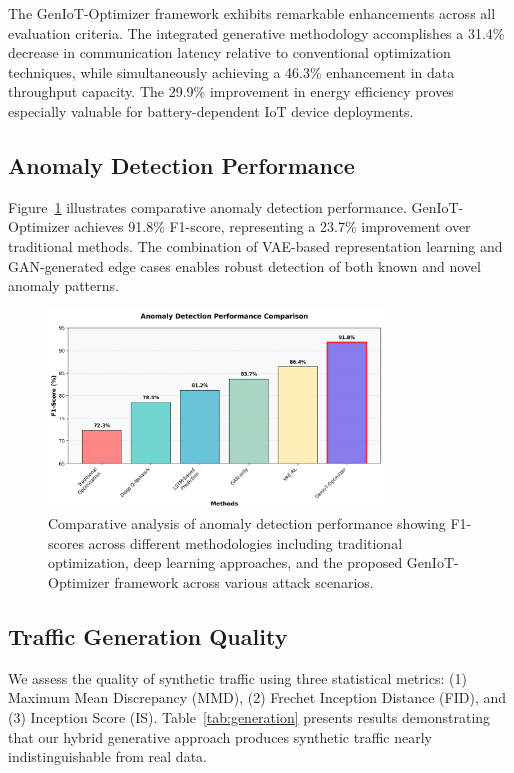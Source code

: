 \documentclass[conference]{IEEEtran}
\begin{document}
The GenIoT-Optimizer framework exhibits remarkable enhancements across all evaluation criteria. The integrated generative methodology accomplishes a 31.4\% decrease in communication latency relative to conventional optimization techniques, while simultaneously achieving a 46.3\% enhancement in data throughput capacity. The 29.9\% improvement in energy efficiency proves especially valuable for battery-dependent IoT device deployments.

\subsection{Anomaly Detection Performance}

Figure~\ref{fig:anomaly} illustrates comparative anomaly detection performance. GenIoT-Optimizer achieves 91.8\% F1-score, representing a 23.7\% improvement over traditional methods. The combination of VAE-based representation learning and GAN-generated edge cases enables robust detection of both known and novel anomaly patterns.

\begin{figure}[!t]
\centering
\includegraphics[width=3.5in]{anomaly_detection_performance.png}
\caption{Comparative analysis of anomaly detection performance showing F1-scores across different methodologies including traditional optimization, deep learning approaches, and the proposed GenIoT-Optimizer framework across various attack scenarios.}
\label{fig:anomaly}
\end{figure}

\subsection{Traffic Generation Quality}

We assess the quality of synthetic traffic using three statistical metrics: (1) Maximum Mean Discrepancy (MMD), (2) Frechet Inception Distance (FID), and (3) Inception Score (IS). Table~\ref{tab:generation} presents results demonstrating that our hybrid generative approach produces synthetic traffic nearly indistinguishable from real data.
\end{document}

